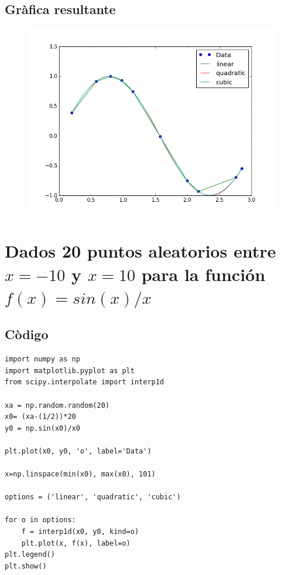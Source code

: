 \documentclass[12pt]{article}
\begin{document}
\subsection{Gràfica resultante}
\begin{figure}[H]
\centering
\includegraphics[scale=.8]{f1}
\end{figure}
\section{Dados 20 puntos aleatorios entre $x=-10$ y $x=10$ para la función $f(x) = sin(x)/x$}


\subsection{Còdigo}
\begin{verbatim}
import numpy as np
import matplotlib.pyplot as plt
from scipy.interpolate import interp1d

xa = np.random.random(20)
x0= (xa-(1/2))*20
y0 = np.sin(x0)/x0

plt.plot(x0, y0, 'o', label='Data')

x=np.linspace(min(x0), max(x0), 101)

options = ('linear', 'quadratic', 'cubic')

for o in options:
    f = interp1d(x0, y0, kind=o)    
    plt.plot(x, f(x), label=o)     
plt.legend()
plt.show()
\end{verbatim}
\end{document}

